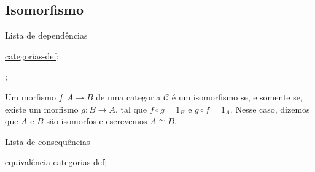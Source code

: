 \subsection{Isomorfismo}
\label{isomorfismo-em-categorias-def}
\begin{titlemize}{Lista de dependências}
	\item \hyperref[categorias-def]{categorias-def};\\ %
	\item \hyperref[]{};\\
\end{titlemize}
\begin{defi}[Isomorfismo]
	Um morfismo $f:A \longrightarrow B$ de uma categoria $\mathcal{C}$ é um isomorfismo se, e somente se, existe um morfismo $g:B \longrightarrow A$, tal que $f \circ g = 1_B$ e $g \circ f = 1_A$. Nesse caso, dizemos que $A$ e $B$ são isomorfos e escrevemos $A \cong B$.
\end{defi}


\begin{titlemize}{Lista de consequências}
	\item \hyperref[equivalência-categorias-def]{equivalência-categorias-def};\\ %
	\item \hyperref[]{}
\end{titlemize}

